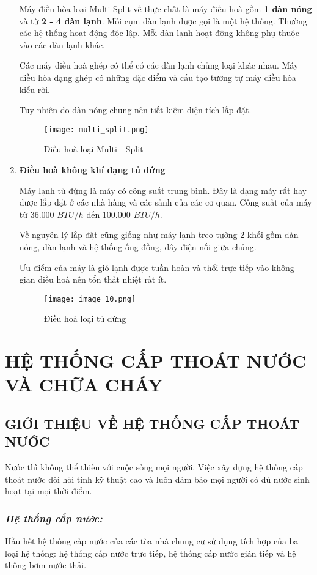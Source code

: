 \begin{enumerate}
		Máy điều hòa loại Multi-Split về thực chất là máy điều hoà gồm \textbf{1 dàn nóng} và từ \textbf{2 - 4 dàn lạnh}. Mỗi cụm dàn lạnh được gọi là một hệ thống. Thường các hệ thống hoạt động độc lập. Mỗi dàn lạnh hoạt động không phụ thuộc vào các dàn lạnh khác. 
		
		Các máy điều hoà ghép có thể có các dàn lạnh chủng loại khác nhau. Máy điều hòa dạng ghép có những đặc điểm và cấu tạo tương tự máy điều hòa kiểu rời.
		
		Tuy nhiên do dàn nóng chung nên tiết kiệm diện tích lắp đặt.

\begin{figure}[H]
	\centering
	\texttt{[image: multi\_split.png]}
	\caption{Điều hoà loại Multi - Split}
\end{figure}		
		
		\item \textbf{Điều hoà không khí dạng tủ đứng}
		
		Máy lạnh tủ đứng là máy có công suất trung bình. Đây là dạng máy rất hay được lắp đặt ở các nhà hàng và các sảnh của các cơ quan. Công suất của máy từ 36.000 $ BTU/h $ đến 100.000 $ BTU/h $. 
		
		Về nguyên lý lắp đặt cũng giống như máy lạnh treo tường 2 khối gồm dàn nóng, dàn lạnh và hệ thống ống đồng, dây điện nối giữa chúng. 
		
		Ưu điểm của máy là gió lạnh được tuần hoàn và thổi trực tiếp vào không gian điều hoà nên tổn thất nhiệt rất ít.
\begin{figure}[H]
	\centering
	\texttt{[image: image\_10.png]}
	\caption{Điều hoà loại tủ đứng}
\end{figure}		
	\end{enumerate}
	
	\section{HỆ THỐNG CẤP THOÁT NƯỚC VÀ CHỮA CHÁY}
	\subsection{GIỚI THIỆU VỀ HỆ THỐNG CẤP THOÁT NƯỚC}
	Nước thì không thể thiếu với cuộc sống mọi người. Việc xây dựng hệ thống cáp thoát nước đòi hỏi tính kỹ thuật cao và luôn đảm bảo mọi người có đủ nước sinh hoạt tại mọi thời điểm.
	
	\subsubsection{\emph{Hệ thống cấp nước:}}
	Hầu hết hệ thống cấp nước của các tòa nhà chung cư sử dụng tích hợp của ba loại hệ thống: hệ thống cấp nước trực tiếp, hệ thống cấp nước gián tiếp và hệ thống bơm nước thải.
		
